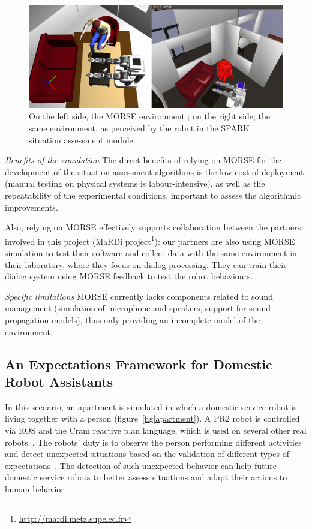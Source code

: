 \documentclass[conference]{IEEEtran}
\begin{document}
\begin{figure}[H]
      \centering
      \includegraphics[width=\linewidth]{morsespark.png}
      \caption{On the left side, the MORSE environment ; on the right side, the same
      environment, as perceived by the robot in the SPARK situation assessment
      module.}
      \label{fig|spark}
\end{figure}

\emph{Benefits of the simulation} The direct benefits of relying on MORSE for the
development of the situation assessment algorithms is the low-cost of deployment
(manual testing on physical systems is labour-intensive), as well as the
repeatability of the experimental conditions, important to assess the
algorithmic improvements.

Also, relying on MORSE effectively supports collaboration between the partners
involved in this project (MaRDi
project\footnote{\url{http://mardi.metz.supelec.fr}}): our partners are also
using MORSE simulation to test their software and collect data with the same
environment in their laboratory, where they focus on dialog processing. They can
train their dialog system using MORSE feedback to test the robot behaviours.

\emph{Specific limitations} MORSE currently lacks components
related to sound management (simulation of microphone and speakers, support for
sound propagation models), thus only providing an incomplete model of the
environment.

\subsection{An Expectations Framework for Domestic Robot Assistants}
\label{sc:expectations}

In this scenario, an apartment is simulated in which a domestic 
service robot is living together with a person (figure~\ref{fig|apartment}). 
A PR2 robot is controlled via ROS and the {\sc Cram} reactive plan language, 
which is used on several other real robots~\cite{pancakes11humanoids}. The robots' 
duty is to observe the person performing different activities and detect unexpected 
situations based on the validation of different types of expectations~\cite{Karg2013}. 
The detection of such unexpected behavior can help future domestic service robots 
to better assess situations and adapt their actions to human behavior.
\end{document}
